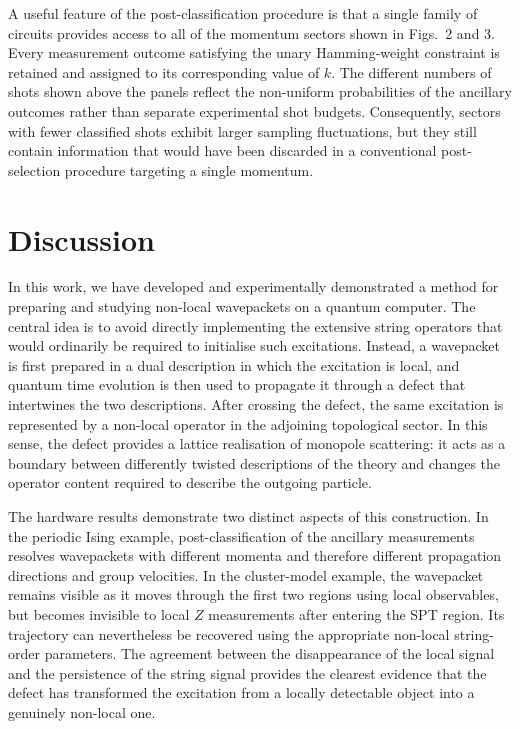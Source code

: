 \documentclass[aps,floatfix,10pt,amssymb,amsfont,amsmath,superscriptaddress,float,nofootinbib,longbibliography,nobalancelastpage,twocolumn,prx]{revtex4-2}
\begin{document}
A useful feature of the post-classification procedure is that a single family of circuits provides access to all of the momentum sectors shown in Figs.~2 and 3. Every measurement outcome satisfying the unary Hamming-weight constraint is retained and assigned to its corresponding value of $k$. The different numbers of shots shown above the panels reflect the non-uniform probabilities of the ancillary outcomes rather than separate experimental shot budgets. Consequently, sectors with fewer classified shots exhibit larger sampling fluctuations, but they still contain information that would have been discarded in a conventional post-selection procedure targeting a single momentum.
\section{Discussion}

In this work, we have developed and experimentally demonstrated a method for preparing and studying non-local wavepackets on a quantum computer. The central idea is to avoid directly implementing the extensive string operators that would ordinarily be required to initialise such excitations. Instead, a wavepacket is first prepared in a dual description in which the excitation is local, and quantum time evolution is then used to propagate it through a defect that intertwines the two descriptions. After crossing the defect, the same excitation is represented by a non-local operator in the adjoining topological sector. In this sense, the defect provides a lattice realisation of monopole scattering: it acts as a boundary between differently twisted descriptions of the theory and changes the operator content required to describe the outgoing particle.

The hardware results demonstrate two distinct aspects of this construction. In the periodic Ising example, post-classification of the ancillary measurements resolves wavepackets with different momenta and therefore different propagation directions and group velocities. In the cluster-model example, the wavepacket remains visible as it moves through the first two regions using local observables, but becomes invisible to local $Z$ measurements after entering the SPT region. Its trajectory can nevertheless be recovered using the appropriate non-local string-order parameters. The agreement between the disappearance of the local signal and the persistence of the string signal provides the clearest evidence that the defect has transformed the excitation from a locally detectable object into a genuinely non-local one.
\end{document}
